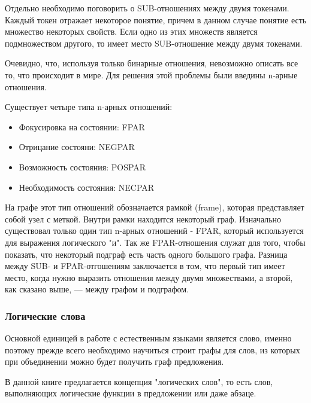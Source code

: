 Отдельно необходимо поговорить о SUB-отношениях между двумя токенами. Каждый токен отражает некоторое 
понятие, причем в данном случае понятие есть множество некоторых свойств. Если одно из этих  множеств 
является подмножеством другого, то имеет место SUB-отношение между двумя токенами.
 
Очевидно, что, используя только бинарные отношения, невозможно описать все то, что происходит в мире.
Для решения этой проблемы были введины n-арные отношения. 

Существует четыре типа n-арных отношений:

\begin {itemize}

\item{
Фокусировка на состоянии: FPAR
}

\item{
Отрицание состояни: NEGPAR
}

\item{
Возможность состояния: POSPAR 
}

\item{
Необходимость состояния: NECPAR
}
\end{itemize}

На графе этот тип отношений обозначается рамкой (frame), которая представляет собой  узел с меткой. Внутри рамки %
находится некоторый граф.
Изначально существовал только один тип n-арных отношений - FPAR, который используется для выражения логического "и".
Так же FPAR-отношения служат для того, чтобы показать, что некоторый подграф есть часть одного большого графа. Разница
между SUB- и FPAR-отгошениям заключается в том, что первый тип имеет место, когда нужно выразить отношения между двумя
множествами, а второй, как сказано выше, --- между графом и подграфом.

 

\subsubsection {Логические слова}
Основной единицей в работе с естественным языками является слово, именно поэтому прежде всего необходимо научиться 
строит графы для слов, из которых при объединении можно будет получить граф предложения.

В данной книге предлагается концепция "логических слов", то есть слов, выполняющих логические функции в предложении
или даже абзаце.

